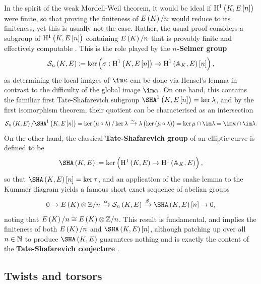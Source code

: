 In the spirit of the weak Mordell-Weil theorem, it would be ideal if $ \HE[n]{K} $ were finite, so that proving the finiteness of $ \En{K} $ would reduce to its finiteness, yet this is usually not the case. Rather, the usual proof considers a subgroup of $ \HE[n]{K} $ containing $ \En{K} $ that is provably finite \cite[Theorem X.4.2(b)]{Sil09} and effectively computable \cite[Remark X.4.5]{Sil09}. This is the role played by the \textbf{$ n $-Selmer group}
$$ \Sel[n] \coloneqq \ker \br{\sigma : \HE[n]{K} \to \HE{\AA_K}\sbr{n}}, $$
as determining the local images of $ \im \kappa $ can be done via Hensel's lemma in contrast to the difficulty of the global image $ \im \alpha $. On one hand, this contains the familiar first Tate-Shafarevich subgroup $ \Sha[K, E\sbr{n}] = \ker \lambda $, and by the first isomorphism theorem, their quotient can be characterised as an intersection
$$ \Sel[n] / \Sha[K, E\sbr{n}] = \ker \br{\mu \circ \lambda} / \ker \lambda \xrightarrow{\sim} \lambda\br{\ker \br{\mu \circ \lambda}} = \ker \mu \cap \im \lambda = \im \kappa \cap \im \lambda. $$
On the other hand, the classical \textbf{Tate-Shafarevich group} of an elliptic curve is defined to be
$$ \Sha \coloneqq \ker \br{\HE{K} \to \HE{\AA_K}}, $$
so that $ \Sha\sbr{n} = \ker \tau $, and an application of the snake lemma to the Kummer diagram yields a famous short exact sequence of abelian groups \cite[Theorem X.4.2(a)]{Sil09}
$$ 0 \to E\br{K} \otimes \ZZ / n \xrightarrow{\alpha} \Sel[n] \xrightarrow{\beta} \Sha\sbr{n} \to 0, $$
noting that $ \En{K} \cong E\br{K} \otimes \ZZ / n $. This result is fundamental, and implies the finiteness of both $ \En{K} $ and $ \Sha\sbr{n} $, although patching up over all $ n \in \mathbb{N} $ to produce $ \Sha $ guarantees nothing and is exactly the content of the \textbf{Tate-Shafarevich conjecture} \cite[Conjecture X.4.13]{Sil09}.

\pagebreak

\subsection{Twists and torsors}

